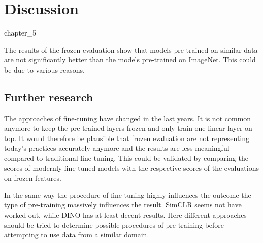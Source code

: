 \chapter{Discussion}{chapter_5}

The results of the frozen evaluation show that models pre-trained on similar data are not significantly better than the models pre-trained on ImageNet. 
This could be due to various reasons.

\section{Further research}
The approaches of fine-tuning have changed in the last years. It is not common anymore to keep the pre-trained layers frozen and only train one linear layer on top. 
It would therefore be plausible that frozen evaluation are not representing today's practices accurately anymore and the results are less meaningful compared to traditional fine-tuning.
This could be validated by comparing the scores of modernly fine-tuned models with the respective scores of the evaluations on frozen features.

In the same way the procedure of fine-tuning highly influences the outcome the type of pre-training massively influences the result. SimCLR seems not have worked out, while DINO has at least decent results. 
Here different approaches should be tried to determine possible procedures of pre-training before attempting to use data from a similar domain.

















